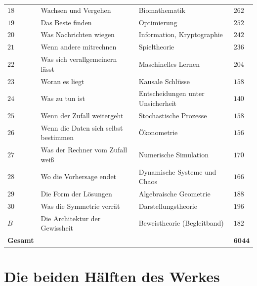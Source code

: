 \begin{center}
{\begin{longtable}{@{}P{1.4cm}P{4.2cm}P{4.2cm}P{1.3cm}@{}}
$18$ & Wachsen und Vergehen & Biomathematik & $262$\\
$19$ & Das Beste finden & Optimierung & $252$\\
$20$ & Was Nachrichten wiegen & Information, Kryptographie & $242$\\
$21$ & Wenn andere mitrechnen & Spieltheorie & $236$\\
$22$ & Was sich verallgemeinern lässt & Maschinelles Lernen & $204$\\
$23$ & Woran es liegt & Kausale Schlüsse & $158$\\
$24$ & Was zu tun ist & Entscheidungen unter Unsicherheit & $140$\\
$25$ & Wenn der Zufall weitergeht & Stochastische Prozesse & $158$\\
$26$ & Wenn die Daten sich selbst bestimmen & Ökonometrie & $156$\\
$27$ & Was der Rechner vom Zufall weiß & Numerische Simulation & $170$\\
$28$ & Wo die Vorhersage endet & Dynamische Systeme und Chaos & $166$\\
\midrule
$29$ & Die Form der Lösungen & Algebraische Geometrie & $188$\\
$30$ & Was die Symmetrie verrät & Darstellungstheorie & $196$\\
\midrule
$B$ & Die Architektur der Gewissheit & Beweistheorie (Begleitband) & $182$\\
\midrule
\textbf{Gesamt} & & & $\mathbf{6044}$\\
\bottomrule
\end{longtable}}
\end{center}

\section{Die beiden Hälften des Werkes}

